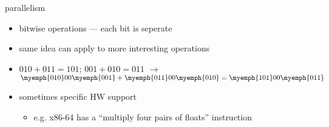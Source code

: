 \begin{frame}{parallelism}
    \begin{itemize}
    \item bitwise operations --- each bit is seperate
    \vspace{.5cm}
    \item<2-> same idea can apply to more interesting operations
    \item<2-> $010 + 011 = 101$; $001 + 010 = 011$ $\rightarrow$ $\myemph{010}00\myemph{001} + \myemph{011}00\myemph{010} = \myemph{101}00\myemph{011}$
    \vspace{.5cm}
    \item<3-> sometimes specific HW support
        \begin{itemize}
        \item e.g. x86-64 has a ``multiply four pairs of floats'' instruction
        \end{itemize}
    \end{itemize}
\end{frame}

